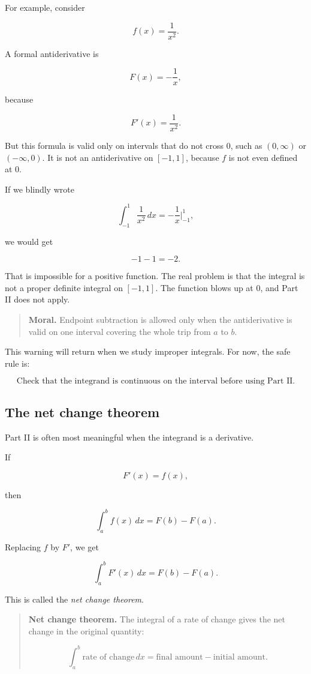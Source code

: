 For example, consider

\[
f(x)=\frac1{x^2}.
\]

A formal antiderivative is

\[
F(x)=-\frac1x,
\]

because

\[
F'(x)=\frac1{x^2}.
\]

But this formula is valid only on intervals that do not cross \(0\), such as \((0,\infty)\)
or \((-\infty,0)\).  It is not an antiderivative on \([-1,1]\), because \(f\) is not even
defined at \(0\).

If we blindly wrote

\[
\int_{-1}^1 \frac1{x^2}\,dx
=
-\frac1x\Big|_{-1}^{1},
\]

we would get

\[
-1-1=-2.
\]

That is impossible for a positive function.  The real problem is that the integral is not
a proper definite integral on \([-1,1]\).  The function blows up at \(0\), and Part II does
not apply.

\begin{quote}
\textbf{Moral.}
Endpoint subtraction is allowed only when the antiderivative is valid on one interval
covering the whole trip from \(a\) to \(b\).
\end{quote}

This warning will return when we study improper integrals.  For now, the safe rule is:

\[
\boxed{
\text{Check that the integrand is continuous on the interval before using Part II.}
}
\]

\subsection{The net change theorem}
\label{subsec:net-change-theorem}

Part II is often most meaningful when the integrand is a derivative.

If

\[
F'(x)=f(x),
\]

then

\[
\int_a^b f(x)\,dx
=
F(b)-F(a).
\]

Replacing \(f\) by \(F'\), we get

\[
\boxed{
\int_a^b F'(x)\,dx=F(b)-F(a).
}
\]

This is called the \emph{net change theorem}.

\begin{quote}
\textbf{Net change theorem.}
The integral of a rate of change gives the net change in the original quantity:

\[
\boxed{
\int_a^b \text{rate of change}\,dx
=
\text{final amount}-\text{initial amount}.
}
\]
\end{quote}


